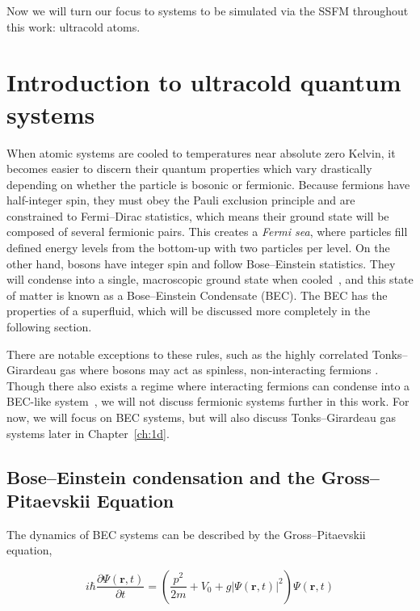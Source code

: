 Now we will turn our focus to systems to be simulated via the SSFM throughout this work: ultracold atoms.

\section{Introduction to ultracold quantum systems}
\label{sec:intro}

When atomic systems are cooled to temperatures near absolute zero Kelvin, it becomes easier to discern their quantum properties which vary drastically depending on whether the particle is bosonic or fermionic.
Because fermions have half-integer spin, they must obey the Pauli exclusion principle and are constrained to Fermi--Dirac statistics, which means their ground state will be composed of several fermionic pairs.
This creates a \textit{Fermi sea}, where particles fill defined energy levels from the bottom-up with two particles per level.
On the other hand, bosons have integer spin and follow Bose--Einstein statistics.
They will condense into a single, macroscopic ground state when cooled~\cite{einstein1925, fetter2003}, and
this state of matter is known as a Bose--Einstein Condensate (BEC).
The BEC has the properties of a superfluid, which will be discussed more completely in the following section.

There are notable exceptions to these rules, such as the highly correlated Tonks--Girardeau gas where bosons may act as spinless, non-interacting fermions \cite{girardeau1960, schloss2016}.
Though there also exists a regime where interacting fermions can condense into a BEC-like system~\cite{nozieres1985, bulgac2014}, we will not discuss fermionic systems further in this work.
For now, we will focus on BEC systems, but will also discuss Tonks--Girardeau gas systems later in Chapter~\ref{ch:1d}.


\subsection{Bose--Einstein condensation and the Gross--Pitaevskii Equation}

The dynamics of BEC systems can be described by the Gross--Pitaevskii equation, 

\begin{equation}
i \hbar \frac{\partial \Psi(\mathbf{r},t)}{\partial t} = \left(\frac{p^2}{2m} + V_0 + g |\Psi(\mathbf{r},t)|^2 \right)\Psi(\mathbf{r},t)
\label{eqn:GPE}
\end{equation}

